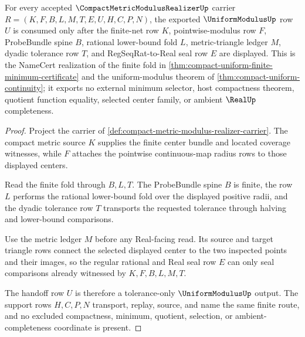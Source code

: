 \begin{theorem}
\label{thm:compact-metric-modulus-realizer-finite-net-fold}
For every accepted $\CompactMetricModulusRealizerUp$ carrier $R=(K,F,B,L,M,T,E,U,H,C,P,N)$, the exported $\UniformModulusUp$ row $U$ is consumed only after the finite-net row $K$, pointwise-modulus row $F$, ProbeBundle spine $B$, rational lower-bound fold $L$, metric-triangle ledger $M$, dyadic tolerance row $T$, and RegSeqRat-to-Real seal row $E$ are displayed. This is the NameCert realization of the finite fold in \autoref{thm:compact-uniform-finite-minimum-certificate} and the uniform-modulus theorem of \autoref{thm:compact-uniform-continuity}; it exports no external minimum selector, host compactness theorem, quotient function equality, selected center family, or ambient $\RealUp$ completeness.
\end{theorem}
\begin{proof}
Project the carrier of \autoref{def:compact-metric-modulus-realizer-carrier}. The compact metric source $K$ supplies the finite center bundle and located coverage witnesses, while $F$ attaches the pointwise continuous-map radius rows to those displayed centers.

Read the finite fold through $B,L,T$. The ProbeBundle spine $B$ is finite, the row $L$ performs the rational lower-bound fold over the displayed positive radii, and the dyadic tolerance row $T$ transports the requested tolerance through halving and lower-bound comparisons.

Use the metric ledger $M$ before any Real-facing read. Its source and target triangle rows connect the selected displayed center to the two inspected points and their images, so the regular rational and Real seal row $E$ can only seal comparisons already witnessed by $K,F,B,L,M,T$.

The handoff row $U$ is therefore a tolerance-only $\UniformModulusUp$ output. The support rows $H,C,P,N$ transport, replay, source, and name the same finite route, and no excluded compactness, minimum, quotient, selection, or ambient-completeness coordinate is present.
\end{proof}



